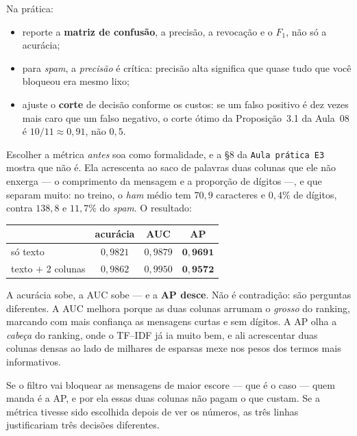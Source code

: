 \documentclass[11pt,a4paper]{article}
\begin{document}
Na prática:
\begin{itemize}[leftmargin=1.4cm,nosep]
  \item reporte a \textbf{matriz de confusão}, a precisão, a revocação e o $F_1$,
        não só a acurácia;
  \item para \emph{spam}, a \emph{precisão} é crítica: precisão alta significa que
        quase tudo que você bloqueou era mesmo lixo;
  \item ajuste o \textbf{corte} de decisão conforme os custos: se um falso positivo
        é dez vezes mais caro que um falso negativo, o corte ótimo da
        Proposição~3.1 da Aula~08 é $10/11\approx0{,}91$, não $0{,}5$.
\end{itemize}

\begin{observacao}
Escolher a métrica \emph{antes} soa como formalidade, e a §8 da \texttt{Aula prática
E3} mostra que não é. Ela acrescenta ao saco de palavras duas colunas que ele não
enxerga --- o comprimento da mensagem e a proporção de dígitos ---, e que separam
muito: no treino, o \emph{ham} médio tem $70{,}9$ caracteres e $0{,}4\%$ de dígitos,
contra $138{,}8$ e $11{,}7\%$ do \emph{spam}. O resultado:

\begin{center}\small
\begin{tabular}{lccc}
\toprule
 & acurácia & AUC & AP \\
\midrule
só texto          & $0{,}9821$ & $0{,}9879$ & $\mathbf{0{,}9691}$ \\
texto $+$ 2 colunas & $0{,}9862$ & $0{,}9950$ & $\mathbf{0{,}9572}$ \\
\bottomrule
\end{tabular}
\end{center}

A acurácia sobe, a AUC sobe --- e a \textbf{AP desce}. Não é contradição: são
perguntas diferentes. A AUC melhora porque as duas colunas arrumam o \emph{grosso}
do ranking, marcando com mais confiança as mensagens curtas e sem dígitos. A AP olha
a \emph{cabeça} do ranking, onde o TF--IDF já ia muito bem, e ali acrescentar duas
colunas densas ao lado de milhares de esparsas mexe nos pesos dos termos mais
informativos.

Se o filtro vai bloquear as mensagens de maior escore --- que é o caso --- quem
manda é a AP, e por ela essas duas colunas não pagam o que custam. Se a métrica
tivesse sido escolhida depois de ver os números, as três linhas justificariam três
decisões diferentes.
\end{observacao}
\end{document}
